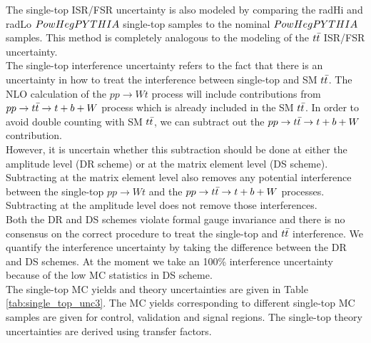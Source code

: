 \indent The single-top ISR/FSR uncertainty is also modeled by comparing the radHi and radLo $PowHegPYTHIA$ single-top samples to the nominal $PowHegPYTHIA$ samples.  This method is completely analogous to the modeling of the $t\bar{t}$ ISR/FSR uncertainty. \\

\indent The single-top interference uncertainty refers to the fact that there is an uncertainty in how to treat the interference between single-top and SM $t\bar{t}$.  The NLO calculation of the $pp \rightarrow Wt$ process will include contributions from $ pp \rightarrow t\bar{t} \rightarrow t + b + W$ process which is already included in the SM $t\bar{t}$.  In order to avoid double counting with SM $t\bar{t}$, we can subtract out the $pp \rightarrow t\bar{t} \rightarrow t + b + W$ contribution.  \\

\indent However, it is uncertain whether this subtraction should be done at either the amplitude level (DR scheme) or at the matrix element level (DS scheme).  Subtracting at the matrix element level also removes any potential interference between the single-top $pp \rightarrow Wt$ and the $ pp \rightarrow t\bar{t} \rightarrow t + b + W$ processes.  Subtracting at the amplitude level does not remove those interferences. \\

\indent  Both the DR and DS schemes violate formal gauge invariance and there is no consensus on the correct procedure to treat the single-top and  $t\bar{t}$ interference.  We quantify the interference uncertainty by taking the difference between the DR and DS schemes.  At the moment we take an 100\% interference uncertainty because of the low MC statistics in DS scheme. \\

\indent The single-top MC yields and theory uncertainties are given in Table \ref{tab:single_top_unc3}.  The MC yields corresponding to different single-top MC samples are given for control, validation and signal regions.  The single-top theory uncertainties are derived using transfer factors. \\

